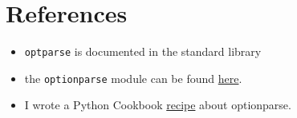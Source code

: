 \documentclass[10pt,english]{article}
\begin{document}

\hypertarget{references}{}
\section*{References}
\begin{itemize}
\item 
\texttt{optparse} is documented in the standard library

\item 
the \texttt{optionparse} module can be found \href{http://www.phyast.pitt.edu/~micheles/python/optionparse}{here}.

\item 
I wrote a Python Cookbook \href{http://aspn.activestate.com/ASPN/Cookbook/Python/Recipe/278844}{recipe} about optionparse.

\end{itemize}
\end{document}
